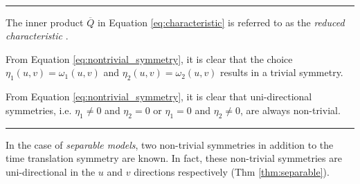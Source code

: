 \dotfill\\
\hrule
\begin{remark}
The inner product $\overline{Q}$ in Equation \eqref{eq:characteristic} is referred to as the \textit{reduced characteristic} \cite{hydon2000symmetry}.
\end{remark}
\begin{remark}
From Equation \eqref{eq:nontrivial_symmetry}, it is clear that the choice $\eta_1(u,v)=\omega_1(u,v)$ and $\eta_2(u,v)=\omega_2(u,v)$ results in a trivial symmetry. 
\end{remark}
\begin{remark}
From Equation \eqref{eq:nontrivial_symmetry}, it is clear that uni-directional symmetries, i.e. $\eta_1\neq 0$ and $\eta_2=0$ or $\eta_1=0$ and $\eta_2\neq 0$, are always non-trivial. 
\end{remark}
\hrule
  $\;$\\\noindent
  In the case of \textit{separable models}, two non-trivial symmetries in addition to the time translation symmetry are known. In fact, these non-trivial symmetries are uni-directional in the $u$ and $v$ directions respectively (Thm \ref{thm:separable}).

